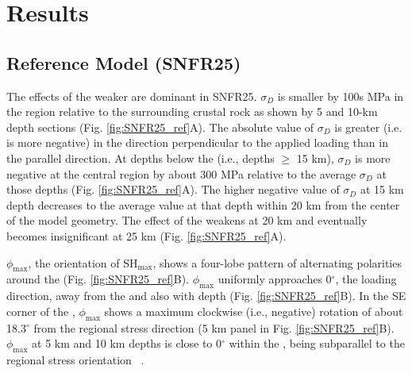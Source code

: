 \documentclass[draft]{agujournal2018}
\begin{document}
\section{Results}

\subsection{Reference Model (SNFR25)} \label{Ref_Model}
The effects of the weaker  are dominant in SNFR25. $\sigma_D$ is smaller by 100s MPa in the  region relative to the surrounding crustal rock as shown by 5 and 10-km depth sections (Fig. \ref{fig:SNFR25_ref}A). The absolute value of $\sigma_D$ is greater (i.e. is more negative) in the direction perpendicular to the applied loading than in the parallel direction. At depths below the  (i.e., depths $\ge$ 15 km), $\sigma_D$ is more negative at the central region by about 300 MPa relative to the average $\sigma_D$ at those depths (Fig. \ref{fig:SNFR25_ref}A). The higher negative value of $\sigma_D$ at 15 km depth decreases to the average value at that depth within 20 km from the center of the model geometry. The effect of the  weakens at 20 km and eventually becomes insignificant at 25 km (Fig. \ref{fig:SNFR25_ref}A).

$\phi_{\max}$, the orientation of SH$_{\max}$, shows a four-lobe pattern of alternating polarities around the  (Fig. \ref{fig:SNFR25_ref}B). $\phi_{\max}$ uniformly approaches 0$^\circ$, the loading direction, away from the  and also with depth (Fig. \ref{fig:SNFR25_ref}B). In the SE corner of the , $\phi_{\max}$ shows a maximum clockwise (i.e., negative) rotation of about 18.3$^\circ$ from the regional stress direction (5 km panel in Fig. \ref{fig:SNFR25_ref}B). 
$\phi_{\max}$ at 5 km and 10 km depths is close to 0$^\circ$ within the , being subparallel to the regional stress orientation ~\citep{Zoback_1992}.
\end{document}
